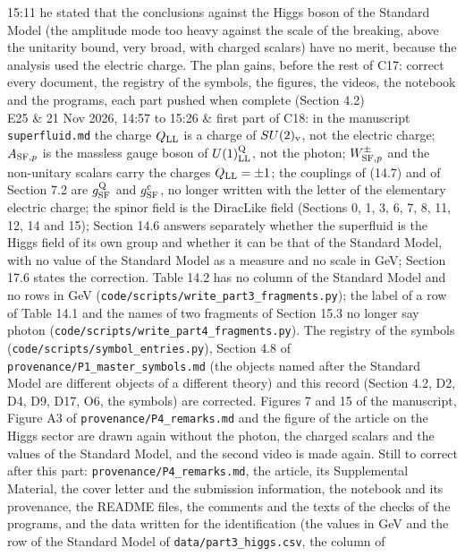 \documentclass[
  10pt,
]{article}
\begin{document}
\begin{longtable}[]
15:11 he stated that the conclusions against the Higgs boson of the
Standard Model (the amplitude mode too heavy against the scale of the
breaking, above the unitarity bound, very broad, with charged scalars)
have no merit, because the analysis used the electric charge. The plan
gains, before the rest of C17: correct every document, the registry of
the symbols, the figures, the videos, the notebook and the programs,
each part pushed when complete (Section 4.2) \\
E25 & 21 Nov 2026, 14:57 to 15:26 & first part of C18: in the manuscript
\texttt{superfluid.md} the charge \(Q_{\rm LL}\) is a charge of
\(SU(2)_{\rm v}\), not the electric charge; \(A_{{\rm SF},p}\) is the
massless gauge boson of \(U(1)^{\rm Q}_{\rm LL}\), not the photon;
\(W^\pm_{{\rm SF},p}\) and the non-unitary scalars carry the charges
\(Q_{\rm LL}=\pm1\); the couplings of (14.7) and of Section 7.2 are
\(g^{\rm Q}_{\rm SF}\) and \(g^{\rm c}_{\rm SF}\), no longer written
with the letter of the elementary electric charge; the spinor field is
the DiracLike field (Sections 0, 1, 3, 6, 7, 8, 11, 12, 14 and 15);
Section 14.6 answers separately whether the superfluid is the Higgs
field of its own group and whether it can be that of the Standard Model,
with no value of the Standard Model as a measure and no scale in GeV;
Section 17.6 states the correction. Table 14.2 has no column of the
Standard Model and no rows in GeV
(\texttt{code/scripts/write\_part3\_fragments.py}); the label of a row
of Table 14.1 and the names of two fragments of Section 15.3 no longer
say photon (\texttt{code/scripts/write\_part4\_fragments.py}). The
registry of the symbols (\texttt{code/scripts/symbol\_entries.py}),
Section 4.8 of \texttt{provenance/P1\_master\_symbols.md} (the objects
named after the Standard Model are different objects of a different
theory) and this record (Section 4.2, D2, D4, D9, D17, O6, the symbols)
are corrected. Figures 7 and 15 of the manuscript, Figure A3 of
\texttt{provenance/P4\_remarks.md} and the figure of the article on the
Higgs sector are drawn again without the photon, the charged scalars and
the values of the Standard Model, and the second video is made again.
Still to correct after this part: \texttt{provenance/P4\_remarks.md},
the article, its Supplemental Material, the cover letter and the
submission information, the notebook and its provenance, the README
files, the comments and the texts of the checks of the programs, and the
data written for the identification (the values in GeV and the row of
the Standard Model of \texttt{data/part3\_higgs.csv}, the column of

\end{longtable}
\end{document}
